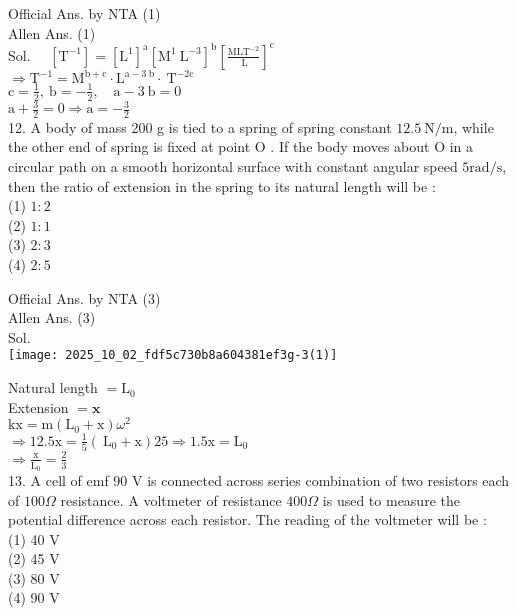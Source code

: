 \documentclass[10pt]{article}
\begin{document}
Official Ans. by NTA (1)\\
Allen Ans. (1)\\
Sol. \(\quad\left[\mathrm{T}^{-1}\right]=\left[\mathrm{L}^{1}\right]^{\mathrm{a}}\left[\mathrm{M}^{1} \mathrm{~L}^{-3}\right]^{\mathrm{b}}\left[\frac{\mathrm{MLT}^{-2}}{\mathrm{~L}}\right]^{\mathrm{c}}\)\\
\(\Rightarrow \mathrm{T}^{-1}=\mathrm{M}^{\mathrm{b}+\mathrm{c}} \cdot \mathrm{L}^{\mathrm{a}-3 \mathrm{~b}} \cdot \mathrm{~T}^{-2 \mathrm{c}}\)\\
\(\mathrm{c}=\frac{1}{2}, \mathrm{~b}=-\frac{1}{2}, \quad \mathrm{a}-3 \mathrm{~b}=0\)\\
\(\mathrm{a}+\frac{3}{2}=0 \Rightarrow \mathrm{a}=-\frac{3}{2}\)\\
12. A body of mass 200 g is tied to a spring of spring constant \(12.5 \mathrm{~N} / \mathrm{m}\), while the other end of spring is fixed at point O . If the body moves about O in a circular path on a smooth horizontal surface with constant angular speed \(5 \mathrm{rad} / \mathrm{s}\), then the ratio of extension in the spring to its natural length will be :\\
(1) \(1: 2\)\\
(2) \(1: 1\)\\
(3) \(2: 3\)\\
(4) \(2: 5\)

Official Ans. by NTA (3)\\
Allen Ans. (3)\\
Sol.\\
\texttt{[image: 2025\_10\_02\_fdf5c730b8a604381ef3g-3(1)]}

Natural length \(=\mathrm{L}_{0}\)\\
Extension \(=\mathbf{x}\)\\
\(\mathrm{kx}=\mathrm{m}\left(\mathrm{L}_{0}+\mathrm{x}\right) \omega^{2}\)\\
\(\Rightarrow 12.5 \mathrm{x}=\frac{1}{5}\left(\mathrm{~L}_{0}+\mathrm{x}\right) 25 \Rightarrow 1.5 \mathrm{x}=\mathrm{L}_{0}\)\\
\(\Rightarrow \frac{\mathrm{x}}{\mathrm{L}_{0}}=\frac{2}{3}\)\\
13. A cell of emf 90 V is connected across series combination of two resistors each of \(100 \Omega\) resistance. A voltmeter of resistance \(400 \Omega\) is used to measure the potential difference across each resistor. The reading of the voltmeter will be :\\
(1) 40 V\\
(2) 45 V\\
(3) 80 V\\
(4) 90 V
\end{document}
